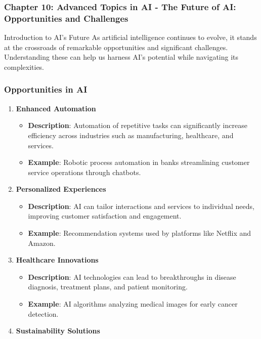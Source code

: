 \documentclass[aspectratio=169]{beamer}
\begin{document}
\begin{frame}[fragile]
    \frametitle{Chapter 10: Advanced Topics in AI - The Future of AI: Opportunities and Challenges}
    \begin{block}{Introduction to AI's Future}
        As artificial intelligence continues to evolve, it stands at the crossroads of remarkable opportunities and significant challenges. Understanding these can help us harness AI's potential while navigating its complexities.
    \end{block}
\end{frame}

\begin{frame}[fragile]
    \frametitle{Opportunities in AI}
    \begin{enumerate}
        \item \textbf{Enhanced Automation}
            \begin{itemize}
                \item \textbf{Description}: Automation of repetitive tasks can significantly increase efficiency across industries such as manufacturing, healthcare, and services.
                \item \textbf{Example}: Robotic process automation in banks streamlining customer service operations through chatbots.
            \end{itemize}
        \item \textbf{Personalized Experiences}
            \begin{itemize}
                \item \textbf{Description}: AI can tailor interactions and services to individual needs, improving customer satisfaction and engagement.
                \item \textbf{Example}: Recommendation systems used by platforms like Netflix and Amazon.
            \end{itemize}
        \item \textbf{Healthcare Innovations}
            \begin{itemize}
                \item \textbf{Description}: AI technologies can lead to breakthroughs in disease diagnosis, treatment plans, and patient monitoring.
                \item \textbf{Example}: AI algorithms analyzing medical images for early cancer detection.
            \end{itemize}
        \item \textbf{Sustainability Solutions}

\end{enumerate}
\end{frame}
\end{document}
